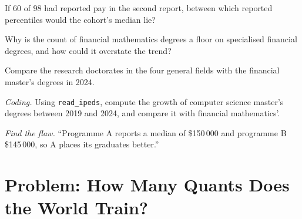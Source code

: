 \begin{exercise}[$\star\star$]\label{exo:in:education-pipelines:4}
If 60 of 98 had reported pay in the second report, between which reported percentiles would the cohort's median lie?
\end{exercise}

\begin{exercise}[$\star\star$]\label{exo:in:education-pipelines:5}
Why is the count of financial mathematics degrees a floor on specialised financial degrees, and how could it overstate
the trend?
\end{exercise}

\begin{exercise}[$\star\star$]\label{exo:in:education-pipelines:6}
Compare the research doctorates in the four general fields with the financial master's degrees in 2024.
\end{exercise}

\begin{exercise}[$\star\star\star$]\label{exo:in:education-pipelines:7}
\emph{Coding.} Using \texttt{read\_ipeds}, compute the growth of computer science master's degrees between 2019 and 2024,
and compare it with financial mathematics'.
\end{exercise}

\begin{exercise}[$\star\star\star$]\label{exo:in:education-pipelines:8}
\emph{Find the flaw.} ``Programme A reports a median of \$150\,000 and programme B \$145\,000, so A places its graduates
better.''
\end{exercise}

\section{Problem: How Many Quants Does the World Train?}

